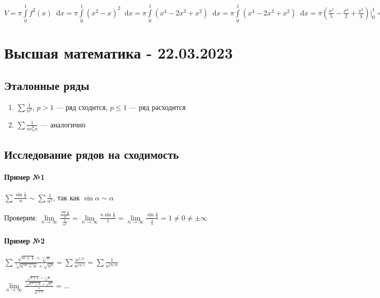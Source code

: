 \documentclass{article}
\newcommand*\diff{\mathop{}\!\mathrm{d}}
\begin{document}
$V = \pi \int\limits_{0}^{1} f^2(x) \diff x = \pi \int\limits_{0}^{1} (x^2-x)^2 \diff x = \pi \int\limits_{0}^{1} (x^4 - 2x^3 + x^2) \diff x = \pi \int\limits_{0}^{1} (x^4 - 2x^3 + x^2) \diff x = \pi (\frac{x^5}{5} - \frac{x^4}{2} + \frac{x^3}{3}) \bigg|_{0}^{1} = \pi (\frac{1}{5} - \frac{1}{2} + \frac{1}{3}) = \frac{\pi}{30}$

\pagebreak
\section{Высшая математика - 22.03.2023}

\subsection{Эталонные ряды}

\begin{enumerate}
    \item $\sum \frac{1}{n^{p}}$, $p > 1$ — ряд сходится, $p \le 1$ — ряд расходится
    \item $\sum \frac{1}{n e_{n}^{p} n}$ — аналогично
\end{enumerate}

\subsection{Исследование рядов на сходимость}

\paragraph{Пример №1}

$\sum \frac{\sin \frac{1}{n}}{n} \sim \sum \frac{1}{n^2}$, так как $\sin \alpha \sim \alpha$

Проверим: $\lim\limits_{n \to \infty} \frac{\frac{\sin \frac{1}{n}}{n}}{\frac{1}{n^2}} = \lim\limits_{n \to \infty} \frac{n \sin \frac{1}{n}}{1} = \lim\limits_{n \to \infty} \frac{\sin \frac{1}{n}}{\frac{1}{n}} = 1 \ne 0 \ne \pm \infty$

\paragraph{Пример №2}

$\sum \frac{\sqrt{n + 1} + \sqrt[3]{n}}{\sqrt[5]{n^12 + n} + \sqrt{n^3}} = \sum \frac{n^{1/2}}{n^{12/5}}  = \sum \frac{1}{n^{19/10}}$

$\lim\limits_{n \to \infty} \frac{\frac{\sqrt{n + 1} + \sqrt[3]{n}}{\sqrt[5]{n^12 + n} + \sqrt{n^3}}}{\frac{1}{n^{19/10}}} = \dots$
\end{document}
